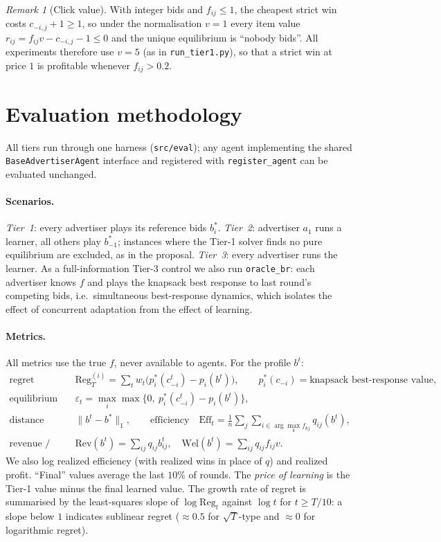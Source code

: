 \documentclass[11pt]{article}
\theoremstyle{remark}
\newtheorem{remark}{Remark}
\newcommand{\Reg}{\mathrm{Reg}}
\begin{document}
\begin{remark}[Click value]\label{rem:v}
With integer bids and $f_{ij}\le 1$, the cheapest strict win costs $c_{-i,j}+1\ge 1$, so under the
normalisation $v=1$ every item value $r_{ij}=f_{ij}v-c_{-i,j}-1\le 0$ and the unique equilibrium is
``nobody bids''. All experiments therefore use $v=5$ (as in \texttt{run\_tier1.py}), so that a strict win at
price $1$ is profitable whenever $f_{ij}>0.2$.
\end{remark}

\section{Evaluation methodology}\label{sec:method}
All tiers run through one harness (\texttt{src/eval}); any agent implementing the shared
\texttt{BaseAdvertiserAgent} interface and registered with \texttt{register\_agent} can be evaluated
unchanged.

\paragraph{Scenarios.} \emph{Tier~1}: every advertiser plays its reference bids $b^*_i$.
\emph{Tier~2}: advertiser $a_1$ runs a learner, all others play $b^*_{-1}$; instances where the Tier-1
solver finds no pure equilibrium are excluded, as in the proposal. \emph{Tier~3}: every advertiser
runs the learner. As a full-information Tier-3 control we also run \texttt{oracle\_br}: each advertiser
knows $f$ and plays the knapsack best response to last round's competing bids, i.e.\ simultaneous
best-response dynamics, which isolates the effect of concurrent adaptation from the effect of learning.

\paragraph{Metrics.} All metrics use the true $f$, never available to agents.
For the profile $b^t$:
\begin{align*}
\text{regret} \quad & \Reg^{(i)}_T=\textstyle\sum_{t} w_t\big(p_i^*(c^t_{-i})-p_i(b^t)\big), \qquad
  p_i^*(c_{-i})=\text{knapsack best-response value},\\
\text{equilibrium gap} \quad & \varepsilon_t=\max_i \max\{0,\ p_i^*(c^t_{-i})-p_i(b^t)\},\\
\text{distance} \quad & \|b^t-b^*\|_1,\qquad
\text{efficiency}\quad \mathrm{Eff}_t=\tfrac1n\textstyle\sum_j\sum_{i\in\arg\max_k f_{kj}} q_{ij}(b^t),\\
\text{revenue / welfare} \quad & \mathrm{Rev}(b^t)=\textstyle\sum_{ij}q_{ij}b^t_{ij},\quad
\mathrm{Wel}(b^t)=\textstyle\sum_{ij}q_{ij}f_{ij}v .
\end{align*}
We also log realized efficiency (with realized wins in place of $q$) and realized profit. ``Final''
values average the last $10\%$ of rounds. The \emph{price of learning} is the Tier-1 value minus the
final learned value. The growth rate of regret is summarised by the least-squares slope of
$\log\Reg_t$ against $\log t$ for $t\ge T/10$: a slope below $1$ indicates sublinear regret ($\approx0.5$
for $\sqrt{T}$-type and $\approx 0$ for logarithmic regret).
\end{document}
